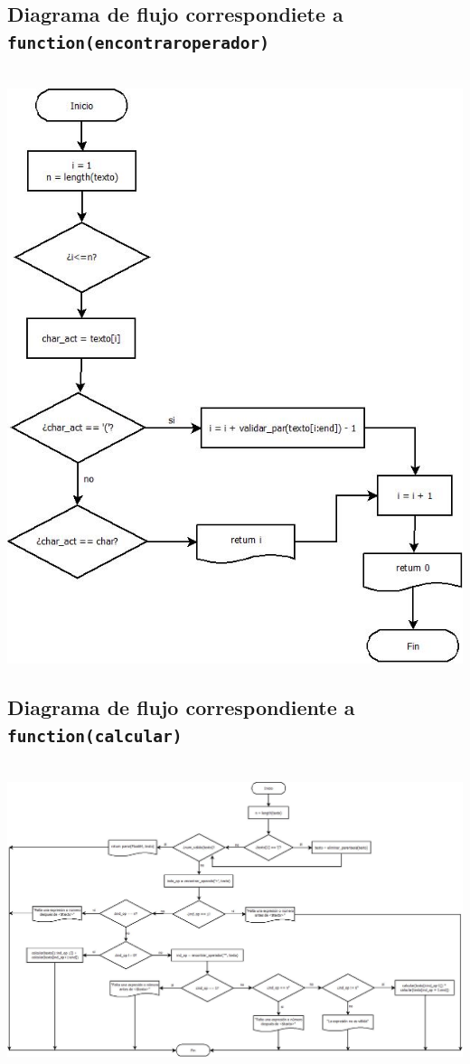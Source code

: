 \documentclass{article}
\begin{document}
\subsection{Diagrama de flujo correspondiete a \texttt{function(encontrar\textunderscore operador)}}\\
\includegraphics[scale=1]{Diagrama5.jpeg}

\begin{landscape}
    \subsection{Diagrama de flujo correspondiente a \texttt{function(calcular)}}\\
\includegraphics[scale=0.55]{Diagrama6.jpeg}
\end{landscape}
\end{document}
